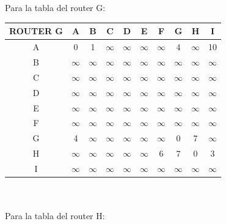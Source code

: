 \documentclass{article}
\begin{document}
\\\\
Para la tabla del router G:\\
\begin{tabular}{ | c | c | c | c | c | c | c | c | c | c |}
\hline                 
ROUTER G    & A      & B      & C      & D      & E      & F      & G      & H      & I      \\
\hline
        A   & 0      & 1      &$\infty$&$\infty$&$\infty$&$\infty$& 4      &$\infty$& 10     \\
\hline
        B   &$\infty$&$\infty$&$\infty$&$\infty$&$\infty$&$\infty$&$\infty$&$\infty$&$\infty$\\
\hline
        C   &$\infty$&$\infty$&$\infty$&$\infty$&$\infty$&$\infty$&$\infty$&$\infty$&$\infty$\\
\hline
        D   &$\infty$&$\infty$&$\infty$&$\infty$&$\infty$&$\infty$&$\infty$&$\infty$&$\infty$\\
\hline
        E   &$\infty$&$\infty$&$\infty$&$\infty$&$\infty$&$\infty$&$\infty$&$\infty$&$\infty$\\
\hline
        F   &$\infty$&$\infty$&$\infty$&$\infty$&$\infty$&$\infty$&$\infty$&$\infty$&$\infty$\\
\hline
        G   & 4      &$\infty$&$\infty$&$\infty$&$\infty$&$\infty$& 0      & 7      &$\infty$\\
\hline
        H   &$\infty$&$\infty$&$\infty$&$\infty$&$\infty$& 6      & 7      & 0      & 3      \\
\hline 
        I   &$\infty$&$\infty$&$\infty$&$\infty$&$\infty$&$\infty$&$\infty$&$\infty$&$\infty$\\
\hline
\end{tabular}
\\\\
Para la tabla del router H:\\
\end{document}

